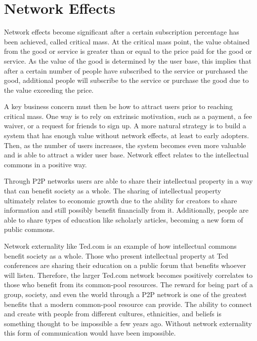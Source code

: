 \section{Network Effects}

Network effects become significant after a certain subscription percentage has been achieved, called critical mass. At the critical mass point, the value obtained from the good or service is greater than or equal to the price paid for the good or service. As the value of the good is determined by the user base, this implies that after a certain number of people have subscribed to the service or purchased the good, additional people will subscribe to the service or purchase the good due to the value exceeding the price.

A key business concern must then be how to attract users prior to reaching critical mass. One way is to rely on extrinsic motivation, such as a payment, a fee waiver, or a request for friends to sign up. A more natural strategy is to build a system that has enough value without network effects, at least to early adopters. Then, as the number of users increases, the system becomes even more valuable and is able to attract a wider user base. Network effect relates to the intellectual commons in a positive way.

Through P2P networks users are able to share their intellectual property in a way that can benefit society as a whole. The sharing of intellectual property ultimately relates to economic growth due to the ability for creators to share information and still possibly benefit financially from it. Additionally, people are able to share types of education like scholarly articles, becoming a new form of public commons.

Network externality like Ted.com is an example of how intellectual commons benefit society as a whole. Those who present intellectual property at Ted conferences are sharing their education on a public forum that benefits whoever will listen. Therefore, the larger Ted.com network becomes positively correlates to those who benefit from its common-pool resources. The reward for being part of a group, society, and even the world through a P2P network is one of the greatest benefits that a modern common-pool resource can provide. The ability to connect and create with people from different cultures, ethnicities, and beliefs is something thought to be impossible a few years ago. Without network externality this form of communication would have been impossible.

